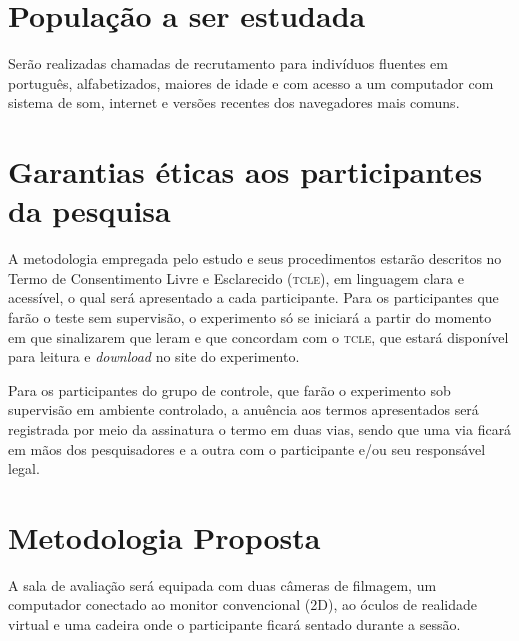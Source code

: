 \documentclass[a4paper,11pt,titlepage,singlespacing]{article}
\begin{document}
\section{População a ser estudada}

\noindent Serão realizadas chamadas de recrutamento para indivíduos fluentes em português, alfabetizados, maiores de idade e com acesso a um computador com sistema de som, internet e versões recentes dos navegadores mais comuns.

\section{Garantias éticas aos participantes da pesquisa}
A metodologia empregada pelo estudo e seus procedimentos estarão descritos no Termo de Consentimento Livre e Esclarecido (\textsc{tcle}), em linguagem clara e acessível, o qual será apresentado a cada participante. Para os participantes que farão o teste sem supervisão, o experimento só se iniciará a partir do momento em que sinalizarem que leram e que concordam com o \textsc{tcle}, que estará disponível para leitura e \textit{download} no site do experimento. 

Para os participantes do grupo de controle, que farão o experimento sob supervisão em ambiente controlado, a anuência aos termos apresentados será registrada por meio da assinatura o termo em duas vias, sendo que uma via ficará em mãos dos pesquisadores e a outra com o participante e/ou seu responsável legal.



\section{Metodologia Proposta}


A sala de avaliação será equipada com duas câmeras de filmagem, um computador conectado ao monitor convencional (2D), ao óculos de realidade virtual e uma cadeira onde o participante ficará sentado durante a sessão.
\end{document}
